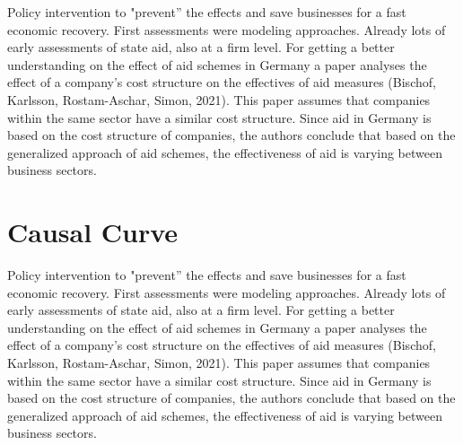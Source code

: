 Policy intervention to "prevent” the effects and save businesses for a fast economic recovery.
First assessments were modeling approaches.
Already lots of early assessments of state aid, also at a firm level.
For getting a better understanding on the effect of aid schemes in Germany a paper analyses the effect of a company’s cost structure on the effectives of aid measures (Bischof, Karlsson, Rostam-Aschar, Simon, 2021). 
This paper assumes that companies within the same sector have a similar cost structure. 
Since aid in Germany is based on the cost structure of companies, the authors conclude that based on the generalized approach of aid schemes, the effectiveness of aid is varying between business sectors.



\section{Causal Curve}

Policy intervention to "prevent” the effects and save businesses for a fast economic recovery.
First assessments were modeling approaches.
Already lots of early assessments of state aid, also at a firm level.
For getting a better understanding on the effect of aid schemes in Germany a paper analyses the effect of a company’s cost structure on the effectives of aid measures (Bischof, Karlsson, Rostam-Aschar, Simon, 2021). 
This paper assumes that companies within the same sector have a similar cost structure. 
Since aid in Germany is based on the cost structure of companies, the authors conclude that based on the generalized approach of aid schemes, the effectiveness of aid is varying between business sectors.